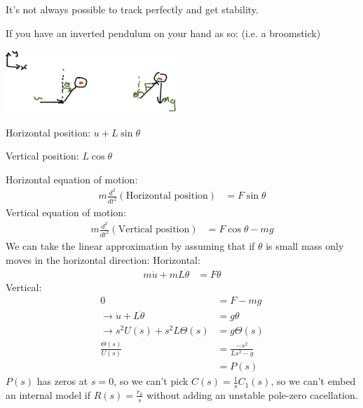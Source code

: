 \begin{enumerate}
\begin{enumerate}
                    It's not always possible to track perfectly and get stability.

                    If you have an inverted pendulum on your hand as so: (i.e. a broomstick)

                    \begin{center}\includegraphics[width=0.5\textwidth,keepaspectratio]{images/5-12-b.png}\end{center}

                    Horizontal position: $u + L \sin{\theta}$

                    Vertical position: $L \cos{\theta}$

                    Horizontal equation of motion:
                    \begin{align*}
                        m \frac{d^2}{dt^2} (\text{Horizontal position}) &= F \sin{\theta}
                    \end{align*}
                    Vertical equation of motion:
                    \begin{align*}
                        m \frac{d^2}{dt^2} (\text{Vertical position}) &= F \cos{\theta} - mg
                    \end{align*}
                    We can take the linear approximation by assuming that if $\theta$ is small mass only moves in the horizontal direction:
                    Horizontal:
                    \begin{align*}
                        m \dot{u} + m L \ddot{\theta} &= F\theta
                    \end{align*}
                    Vertical:
                    \begin{align*}
                        0 &= F - mg \\
                        \rightarrow \dot{u} + L\ddot{\theta} &= g \theta \\
                        \rightarrow s^2 U(s) + s^2 L \Theta(s) &= g \Theta(s) \\
                        \frac{\Theta(s)}{U(s)} &= \frac{-s^2}{Ls^2 - g} \\
                        &= P(s)
                    \end{align*}
                    $P(s)$ has zeros at $s = 0$, so we can't pick $C(s) = \frac{1}{s} C_1(s)$, so we can't embed an internal model if $R(s) = \frac{r_0}{s}$ without adding an unstable pole-zero cacellation.


\end{enumerate}
\end{enumerate}
